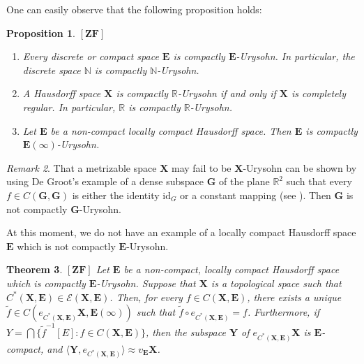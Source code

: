 \documentclass[12pt,twoside,leqno]{article}
\theoremstyle{plain}
\newtheorem{theorem}{Theorem}[section]
\newtheorem{proposition}[theorem]{Proposition}
\theoremstyle{definition}
\theoremstyle{remark}
\newtheorem{remark}[theorem]{Remark}
\begin{document}
One can easily observe that the following proposition holds:
\begin{proposition}
	\label{s4:p12}
	$[\mathbf{ZF}]$
	\begin{enumerate}
		\item[(i)]  Every discrete or compact space $\mathbf{E}$ is compactly $\mathbf{E}$-Urysohn. In particular, the discrete space $\mathbb{N}$ is compactly $\mathbb{N}$-Urysohn.
		\item[(ii)] A Hausdorff space $\mathbf{X}$ is compactly $\mathbb{R}$-Urysohn if and only if $\mathbf{X}$ is completely regular. In particular, $\mathbb{R}$ is compactly $\mathbb{R}$-Urysohn.
		\item[(iii)] Let $\mathbf{E}$ be a non-compact locally compact Hausdorff space. Then $\mathbf{E}$ is compactly $\mathbf{E}(\infty)$-Urysohn.
	\end{enumerate}
\end{proposition}

\begin{remark}
	\label{s4:r13}
	That a metrizable space $\mathbf{X}$  may fail to be $\mathbf{X}$-Urysohn can be shown by using De Groot's example of a dense subspace $\mathbf{G}$ of the plane $\mathbb{R}^2$ such that every $f\in C(\mathbf{G},\mathbf{G})$ is either the identity $\text{id}_{G}$ or a constant mapping (see \cite{DG}). Then $\mathbf{G}$ is not compactly $\mathbf{G}$-Urysohn. 
	
	At this moment, we do not have an example of a locally compact Hausdorff space $\mathbf{E}$ which is not compactly $\mathbf{E}$-Urysohn. 
\end{remark}

\begin{theorem}
	\label{s4:t14}
	$[\mathbf{ZF}]$ Let $\mathbf{E}$ be a non-compact, locally compact Hausdorff space which is compactly $\mathbf{E}$-Urysohn. Suppose that $\mathbf{X}$ is a topological space such that $C^{\ast}(\mathbf{X}, \mathbf{E})\in\mathcal{E}(\mathbf{X}, \mathbf{E})$. Then, for every $f\in C(\mathbf{X}, \mathbf{E})$, there exists a unique $\tilde{f}\in C(e_{C^{\ast}(\mathbf{X}, \mathbf{E})}\mathbf{X}, \mathbf{E}(\infty))$ such that $\tilde{f}\circ e_{C^{\ast}(\mathbf{X}, \mathbf{E})}=f$. Furthermore, if $Y=\bigcap\{\tilde{f}^{-1}[E]: f\in C(\mathbf{X}, \mathbf{E})\}$, then the subspace $\mathbf{Y}$ of $e_{C^{\ast}(\mathbf{X},\mathbf{E})}\mathbf{X}$ is $\mathbf{E}$-compact, and $\langle \mathbf{Y}, e_{C^{\ast}(\mathbf{X}, \mathbf{E})}\rangle\approx v_{\mathbf{E}}\mathbf{X}$.
\end{theorem}
\end{document}
